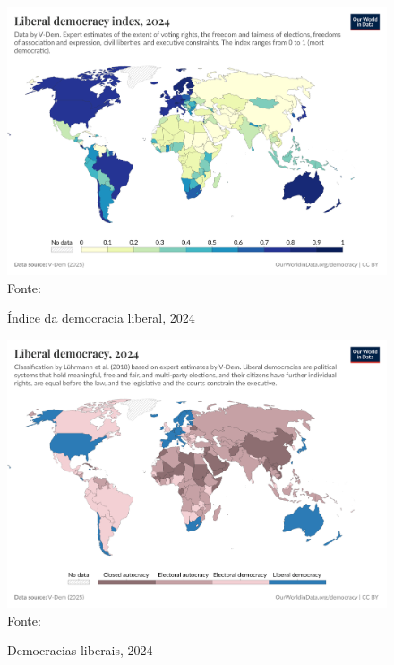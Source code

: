 \begin{figure}[ht]
    \centering
    \caption{Índice da democracia liberal, 2024}
    \includegraphics[width=1\linewidth]{figuras/democracia/liberal-democracy-index.png}
    \label{fig:liberal-democracy-index}
    \footnotesize{Fonte: \cite{liberal_democracy_index}}
\end{figure}

\begin{figure}[ht]
    \centering
    \caption{Democracias liberais, 2024}
    \includegraphics[width=1\linewidth]{figuras/democracia/liberal-democracy-row.png}
    \label{fig:liberal-democracy-row}
    \footnotesize{Fonte: \cite{liberal_democracy_row}}
\end{figure}

